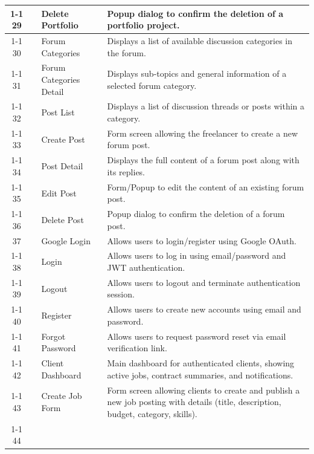 \begin{longtable}{|c|>{\centering\arraybackslash}m{2.5cm}|p{3.5cm}|p{6cm}|}
\\ \cline{1-1}\cline{3-4}
29 &
&
Delete Portfolio &
Popup dialog to confirm the deletion of a portfolio project.
\\ \cline{1-1}\cline{3-4}
30 &
&
Forum Categories &
Displays a list of available discussion categories in the forum.
\\ \cline{1-1}\cline{3-4}
31 &
&
Forum Categories Detail &
Displays sub-topics and general information of a selected forum category.
\\ \cline{1-1}\cline{3-4}
32 &
&
Post List &
Displays a list of discussion threads or posts within a category.
\\ \cline{1-1}\cline{3-4}
33 &
&
Create Post &
Form screen allowing the freelancer to create a new forum post.
\\ \cline{1-1}\cline{3-4}
34 &
&
Post Detail &
Displays the full content of a forum post along with its replies.
\\ \cline{1-1}\cline{3-4}
35 &
&
Edit Post &
Form/Popup to edit the content of an existing forum post.
\\ \cline{1-1}\cline{3-4}
36 &
&
Delete Post &
Popup dialog to confirm the deletion of a forum post.
\\ \hline
37 &
\multirow{22}{2.5cm}{\centering Client} &
Google Login &
Allows users to login/register using Google OAuth.
\\ \cline{1-1}\cline{3-4}
38 &
&
Login &
Allows users to log in using email/password and JWT authentication.
\\ \cline{1-1}\cline{3-4}
39 &
&
Logout &
Allows users to logout and terminate authentication session.
\\ \cline{1-1}\cline{3-4}
40 &
&
Register &
Allows users to create new accounts using email and password.
\\ \cline{1-1}\cline{3-4}
41 &
&
Forgot Password &
Allows users to request password reset via email verification link.
\\ \cline{1-1}\cline{3-4}
42 &
&
Client Dashboard &
Main dashboard for authenticated clients, showing active jobs, contract summaries, and notifications.
\\ \cline{1-1}\cline{3-4}
43 &
&
Create Job Form &
Form screen allowing clients to create and publish a new job posting with details (title, description, budget, category, skills).
\\ \cline{1-1}\cline{3-4}
44 &
&

\end{longtable}
